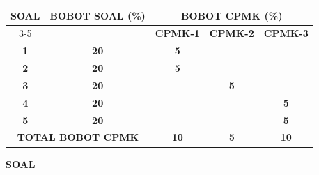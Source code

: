 \documentclass[11pt,letterpaper]{article}
\begin{document}
\begin{center}
  \begin{tabular}{|c|c|c|c|c|}
    \hline
    \multirow{2}{*}{\textbf{SOAL}}                  & \multirow{2}{*}{\textbf{BOBOT SOAL (\%)}} & \multicolumn{3}{c|}{\textbf{BOBOT CPMK (\%)}}                                     \\ \cline{3-5}
                                                    &                                           & \textbf{CPMK-1}                               & \textbf{CPMK-2} & \textbf{CPMK-3} \\ \hline
    \textbf{1}                                      & \textbf{20}                               & \textbf{5}                                    &                 &                 \\ \hline
    \textbf{2}                                      & \textbf{20}                               & \textbf{5}                                    &                 &                 \\ \hline
    \textbf{3}                                      & \textbf{20}                               &                                               & \textbf{5}      &                 \\ \hline
    \textbf{4}                                      & \textbf{20}                               &                                               &                 & \textbf{5}      \\ \hline
    \textbf{5}                                      & \textbf{20}                               &                                               &                 & \textbf{5}      \\ \hline
    \multicolumn{2}{|c|}{\textbf{TOTAL BOBOT CPMK}} & \textbf{10}                               & \textbf{5}                                    & \textbf{10}                       \\ \hline
  \end{tabular}
\end{center}

\vspace{0.25cm}
\begin{center}
  \underline{\textbf{SOAL}}
\end{center}
\end{document}
